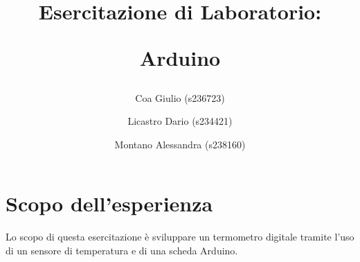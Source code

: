 \documentclass[a4paper]{article}
\title{
	\begin{center}
		Esercitazione di Laboratorio:
	\end{center}
	\newline
	\begin{center}
		Arduino
	\end{center}
}
\author{
	Coa Giulio (s236723)
	\and
	Licastro Dario (s234421)
	\and
	Montano Alessandra (s238160)
}
\begin{document}
	\begin{titlingpage}
		\maketitle
	\end{titlingpage}
	\newpage
	\section{Scopo dell'esperienza}
		Lo scopo di questa esercitazione è sviluppare un termometro digitale tramite l'uso di un sensore di temperatura e di una scheda Arduino.
\end{document}

